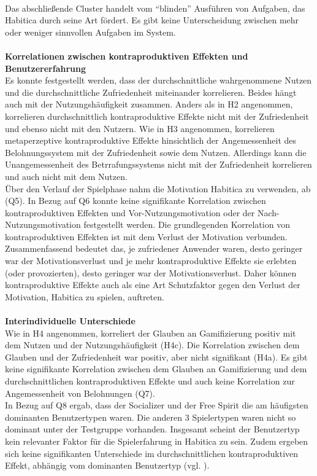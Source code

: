 \documentclass[sigconf, nonacm]{acmart}
\begin{document}
\\
Das abschließende Cluster handelt vom \enquote{blinden} Ausführen von Aufgaben, das Habitica durch seine Art fördert. Es gibt keine Unterscheidung zwischen mehr oder weniger sinnvollen Aufgaben im System. 
\\
\\
\textbf{Korrelationen zwischen kontraproduktiven Effekten und Benutzererfahrung}
\\
Es konnte festgestellt werden, dass der durchschnittliche wahrgenommene Nutzen und die durchschnittliche Zufriedenheit miteinander korrelieren. Beides hängt auch mit der Nutzungshäufigkeit zusammen. 
Anders als in H2 angenommen, korrelieren durchschnittlich kontraproduktive Effekte nicht mit der Zufriedenheit und ebenso nicht mit den Nutzern. Wie in H3 angenommen, korrelieren metaperzeptive kontraproduktive Effekte hinsichtlich der Angemessenheit des Belohnungssystem mit der Zufriedenheit sowie dem Nutzen. Allerdings kann die Unangemessenheit des Betrrafungssystems nicht mit der Zufriedenheit korrelieren und auch nicht mit dem Nutzen.
\\
Über den Verlauf der Spielphase nahm die Motivation Habitica zu verwenden, ab (Q5). In Bezug auf Q6 konnte keine signifikante Korrelation zwischen kontraproduktiven Effekten und Vor-Nutzungsmotivation oder der Nach-Nutzungsmotivation festgestellt werden. Die grundlegenden Korrelation von kontraproduktiven Effekten ist mit dem Verlust der Motivation verbunden. Zusammenfassend bedeutet das, je zufriedener Anwender waren, desto geringer war der Motivationsverlust und je mehr kontraproduktive Effekte sie erlebten (oder provozierten), desto geringer war der Motivationsverlust. Daher können kontraproduktive Effekte auch als eine Art Schutzfaktor gegen den Verlust der Motivation, Habitica zu spielen, auftreten. \\
\\
\textbf{Interindividuelle Unterschiede}
\\
Wie in H4 angenommen, korreliert der Glauben an Gamifizierung positiv mit dem Nutzen und der Nutzungshäufigkeit (H4c). Die Korrelation zwischen dem Glauben und der Zufriedenheit war positiv, aber nicht signifikant (H4a). Es gibt keine signifikante Korrelation zwischen dem Glauben an Gamifizierung und dem durchschnittlichen kontraproduktiven Effekte und auch keine Korrelation zur Angemessenheit von Belohnungen (Q7).
\\
In Bezug auf Q8 ergab, dass der Socializer und der Free Spirit die am häufigsten dominanten Benutzertypen waren. Die anderen 3 Spielertypen waren nicht so dominant unter der Testgruppe vorhanden. Insgesamt scheint der Benutzertyp kein relevanter Faktor für die Spielerfahrung in Habitica zu sein. Zudem ergeben sich keine signifikanten Unterschiede im durchschnittlichen kontraproduktiven Effekt, abhängig vom dominanten Benutzertyp (vgl. \citep{diefenbach_counterproductive_2019}).
\end{document}
